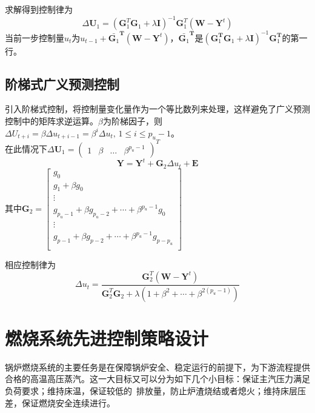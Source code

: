 求解得到控制律为
\begin{equation}
\Delta{\bm{U}_{1}} = (\bm{G}_{1}^{{T}}\bm{G}_{1}+\lambda{\bm{I}})^{-1}\bm{G}_{1}^{{T}}(\bm{W}-\bm{Y}^{t})
\end{equation}
当前一步控制量$u_t$为$u_{t-1}+\bar{\bm{G}_{1}}^{\bm{T}}(\bm{W}-\bm{Y}^{t})$，$\bar{\bm{G}_{1}}^{\bm{T}}$是$(\bm{G}_{1}^{\bm{T}}\bm{G}_{1}+\lambda{\bm{I}})^{-1}\bm{G}_{1}^{\bm{T}}$的第一行。

\subsection{阶梯式广义预测控制}
引入阶梯式控制，将控制量变化量作为一个等比数列来处理，这样避免了广义预测控制中的矩阵求逆运算\cite{吴刚1989预测控制研究及在工业锅炉控制中的应用}。$\beta$为阶梯因子，则$\Delta{U_{t+i}} = \beta\Delta{u_{t+i-1}} = \beta^{i}\Delta{u}_{t},\,1 \leq i \leq p_{u} - 1$。\\

在此情况下$\Delta{\bm{U}_{1}} = {\begin{pmatrix} 1 & \beta &\ldots & \beta^{p_{u}-1} \end{pmatrix}}^{T}$
\begin{equation}
\bm{Y} = \bm{Y}^{t} + \bm{G}_{2}\Delta{u_{t}} + \bm{E}
\end{equation}
其中$\bm{G}_{2} = \left[{\begin{array}{c}
g_{0} \\
g_{1} + \beta{g_{0}}\\
\vdots \\
g_{p_{u}-1} + \beta{g_{p_{u}-2}}+\cdots+\beta^{p_{u}-1}g_{0}\\
\vdots\\
g_{p-1} + \beta{g_{p-2}}+\cdots+\beta^{p_{u}-1}g_{p-p_{u}}\\
\end{array}}\right]$

相应控制律为
\begin{equation}
\Delta{u_{t}} = \frac{\bm{G}_{2}^{T}(\bm{W}-\bm{Y}^{t})}{\bm{G}_{2}^{T}\bm{G}_{2} + \lambda(1+\beta^{2} + \cdots+\beta^{2(p_{u}-1)})}
\end{equation}


\section{燃烧系统先进控制策略设计}
锅炉燃烧系统的主要任务是在保障锅炉安全、稳定运行的前提下，为下游流程提供合格的高温高压蒸汽。这一大目标又可以分为如下几个小目标：保证主汽压力满足负荷要求；维持床温，保证较低的~排放量，防止炉渣烧结或者熄火；维持床层压差，保证燃烧安全连续进行。

